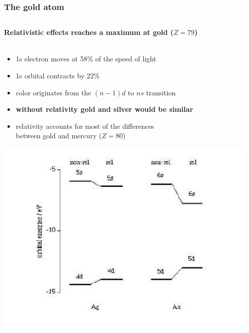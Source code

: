 \documentclass[mathserif,8pt]{beamer}
\begin{document}
\begin{frame}
    \frametitle{The gold atom}
    \begin{columns}
    \begin{column}{.55\textwidth}
	\textbf{Relativistic effects reaches a maximum at gold ($Z=79$)}\\
	\ \\
	\begin{itemize}
	    \item   1s electron moves at 58\% of the speed of light
	    \item   1s orbital contracts by 22\%
	    \item   color originates from the $(n-1)d$ to $ns$ transition
	    \item   \textbf{without relativity gold and silver would be similar}
	    \item   relativity accounts for most of the differences\\
		    between gold and mercury ($Z=80$)
	\end{itemize}
	\centering
	\includegraphics[viewport = 50 50 350 300, clip, scale=0.4]{figures/gold_energy.pdf}
    \end{column}
    \begin{column}{.45\textwidth}
	\centering

\end{column}
\end{columns}
\end{frame}
\end{document}
